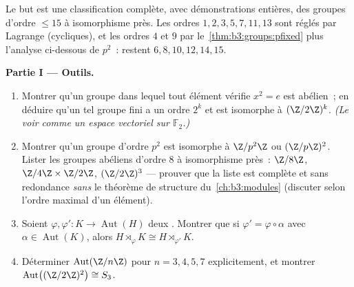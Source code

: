 \begin{problem}\label{pb:b3:groups:1}
Le but est une classification complète, avec démonstrations
entières, des groupes d'ordre $\leq 15$ à isomorphisme près. Les
ordres $1, 2, 3, 5, 7, 11, 13$ sont réglés par Lagrange
(cycliques), et les ordres $4$ et $9$ par
le~\cref{thm:b3:groups:pfixed} plus l'analyse ci-dessous de
$p^2$~: restent $6, 8, 10, 12, 14, 15$.

\medskip
\noindent\textbf{Partie I --- Outils.}
\begin{enumerate}
  \item Montrer qu'un groupe dans lequel tout élément vérifie $x^2
        = e$ est abélien~; en déduire qu'un tel groupe fini a un
        ordre $2^k$ et est isomorphe à $(\Z/2\Z)^k$. \emph{(Le
        voir comme un espace vectoriel sur $\mathbb F_2$.)}
  \item Montrer qu'un groupe d'ordre $p^2$ est isomorphe à
        $\Z/p^2\Z$ ou $(\Z/p\Z)^2$. Lister les groupes abéliens
        d'ordre $8$ à isomorphisme près~: $\Z/8\Z$, $\Z/4\Z
        \times \Z/2\Z$, $(\Z/2\Z)^3$ --- prouver que la liste est
        complète et sans redondance \emph{sans} le théorème de
        structure du~\cref{ch:b3:modules} (discuter selon l'ordre
        maximal d'un élément).
  \item Soient $\varphi, \varphi' \colon K \to
        \operatorname{Aut}(H)$ deux . Montrer que si
        $\varphi' = \varphi \circ \alpha$ avec $\alpha \in
        \operatorname{Aut}(K)$, alors $H \rtimes_{\varphi} K
        \cong H \rtimes_{\varphi'} K$.
  \item Déterminer $\operatorname{Aut}(\Z/n\Z)$ pour $n = 3, 4,
        5, 7$ explicitement, et montrer
        $\operatorname{Aut}\bigl((\Z/2\Z)^2 \bigr) \cong S_3$.
\end{enumerate}


\end{problem}
